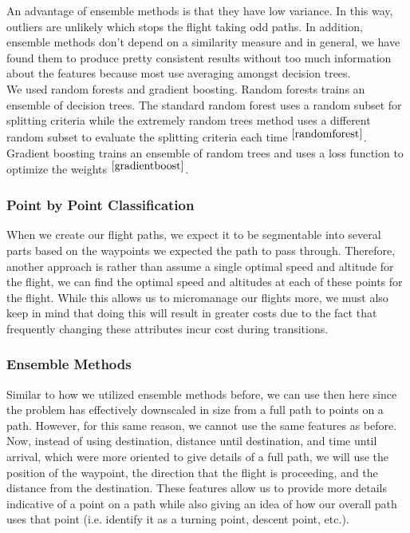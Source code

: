 \documentclass{article}[12pt]
\begin{document}
\begin{multicols}{2}
An advantage of ensemble methods is that they have low variance. In this way, outliers are unlikely which stops the flight taking odd paths. In addition, ensemble methods don't depend on a similarity measure and in general, we have found them to produce pretty consistent results without too much information about the features because most use averaging amongst decision trees.\\

We used random forests and gradient boosting. Random forests trains an ensemble of decision trees. The standard random forest uses a random subset for splitting criteria while the extremely random trees method uses a different random subset to evaluate the splitting criteria each time $^{\cite{randomforest}}$. Gradient boosting trains an ensemble of random trees and uses a loss function to optimize the weights $^{\cite{gradientboost}}$.

\subsubsection{Point by Point Classification}

When we create our flight paths, we expect it to be segmentable into several parts based on the waypoints we expected the path to pass through. Therefore, another approach is rather than assume a single optimal speed and altitude for the flight, we can find the optimal speed and altitudes at each of these points for the flight. While this allows us to micromanage our flights more, we must also keep in mind that doing this will result in greater costs due to the fact that frequently changing these attributes incur cost during transitions.

\subsubsection{Ensemble Methods}

Similar to how we utilized ensemble methods before, we can use then here since the problem has effectively downscaled in size from a full path to points on a path. However, for this same reason, we cannot use the same features as before. Now, instead of using destination, distance until destination, and time until arrival, which were more oriented to give details of a full path, we will use the position of the waypoint, the direction that the flight is proceeding, and the distance from the destination. These features allow us to provide more details indicative of a point on a path while also giving an idea of how our overall path uses that point (i.e. identify it as a turning point, descent point, etc.).


\end{multicols}
\end{document}

